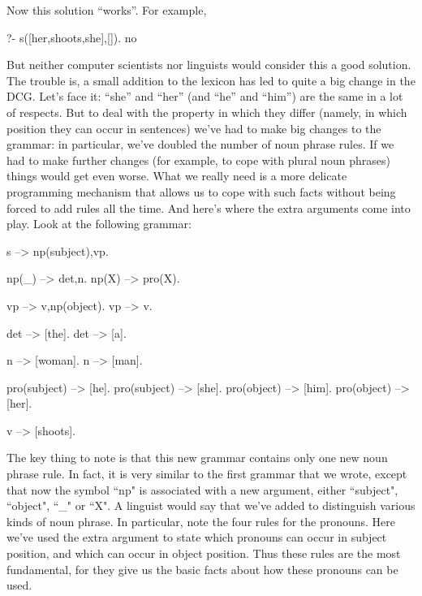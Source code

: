 Now this solution ``works''. For example,
\begin{LPNcodedisplay}
?- s([her,shoots,she],[]).
no
\end{LPNcodedisplay}

But neither computer scientists nor linguists would consider this a
good solution.  The trouble is, a small addition to the lexicon has
led to quite a big change in the DCG. Let's face it: ``she'' and
``her'' (and ``he'' and ``him'') are the same in a lot of respects.
But to deal with the property in which they differ (namely, in which
position they can occur in sentences) we've had to make big changes to
the grammar: in particular, we've doubled the number of noun phrase
rules.  If we had to make further changes (for example, to cope with
plural noun phrases) things would get even worse.  What we really need
is a more delicate programming mechanism that allows us to cope with
such facts without being forced to add rules all the time.  And here's
where the extra arguments come into play.  Look at the following
grammar:

\begin{LPNcodedisplay}
s --> np(subject),vp.

np(_) --> det,n.
np(X) --> pro(X).

vp --> v,np(object).
vp --> v.

det --> [the].
det --> [a].

n --> [woman].
n --> [man].

pro(subject) --> [he].
pro(subject) --> [she].
pro(object) --> [him].
pro(object) --> [her].

v --> [shoots].
\end{LPNcodedisplay}




The key thing to note is that this new grammar contains only one new
noun phrase rule.  In fact, it is very similar to the first grammar
that we wrote, except that now the symbol ``np" is associated with a
new argument, either ``subject", ``object", ``\_" or ``X".  A
linguist would say that we've added  to distinguish
various kinds of noun phrase.  In particular, note the four rules for
the pronouns. Here we've used the extra argument to state which
pronouns can occur in subject position, and which can occur in object
position. Thus these rules are the most fundamental, for they give us
the basic facts about how these pronouns can be used.


